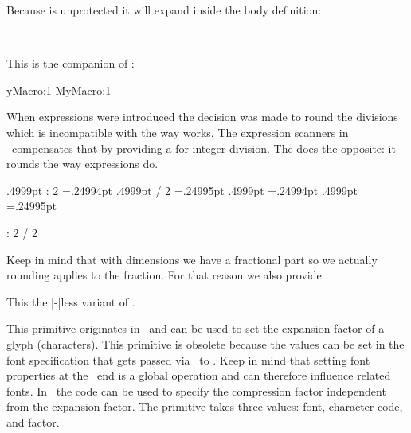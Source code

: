 \typebuffer

Because \type {\foo} is unprotected it will expand inside the body definition:

\startlines \tt
\getbuffer
\stoplines

\stopoldprimitive

\startnewprimitive[title={\prm {edefcsname}}]

This is the companion of :

\starttyping
\expandafter\edef\csname MyMacro:1
             \edefcsname MyMacro:1
\stoptyping

\stopnewprimitive

\startnewprimitive[title={\prm {edivide}}]

When expressions were introduced the decision was made to round the divisions which is
incompatible with the way  works. The expression scanners in \LUAMETATEX\
compensates that by providing a \type {:} for integer division. The  does
the opposite: it rounds the way expressions do.

\startbuffer
\the\dimexpr .4999pt                     : 2 \relax           =.24994pt
\the\dimexpr .4999pt                     / 2 \relax           =.24995pt
\scratchdimen.4999pt \divide {} \the\scratchdimen=.24994pt
\scratchdimen.4999pt \edivide\scratchdimen 2 \the\scratchdimen=.24995pt

\the{}                        : 2 
\the\numexpr   1001                        / 2 \relax             =501
  \divide {} \the\scratchcounter=500
\scratchcounter1001  \edivide\scratchcounter 2 \the\scratchcounter=501
\stopbuffer

\typebuffer

Keep in mind that with dimensions we have a fractional part so we actually
rounding applies to the fraction. For that reason we also provide .

\startlines
\getbuffer
\stoplines

\stopnewprimitive

\startnewprimitive[title={\prm {edivideby}}]

This the |-|less variant of .

\stopnewprimitive

\startnewprimitive[title={\prm {efcode}}]

This primitive originates in \PDFTEX\ and can be used to set the expansion factor
of a glyph (characters). This primitive is obsolete because the values can be set
in the font specification that gets passed via \LUA\ to \TEX. Keep in mind that
setting font properties at the \TEX\ end is a global operation and can therefore
influence related fonts. In \LUAMETATEX\ the \prm {cf} code can be used to
specify the compression factor independent from the expansion factor. The
primitive takes three values: font, character code, and factor.

